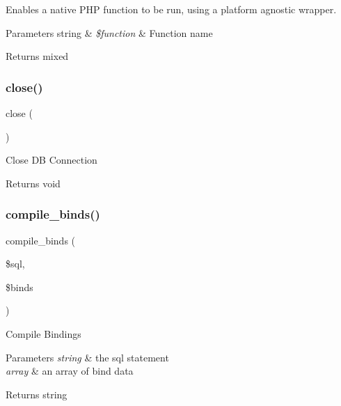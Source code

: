 Enables a native P\+HP function to be run, using a platform agnostic wrapper.


\begin{DoxyParams}[1]{Parameters}
string & {\em \$function} & Function name \\
\hline
\end{DoxyParams}
\begin{DoxyReturn}{Returns}
mixed 
\end{DoxyReturn}
\mbox{\label{class_c_i___d_b__driver_aa69c8bf1f1dcf4e72552efff1fe3e87e}} 
\subsubsection{\texorpdfstring{close()}{close()}}
{\footnotesize\ttfamily close (\begin{DoxyParamCaption}{ }\end{DoxyParamCaption})}

Close DB Connection

\begin{DoxyReturn}{Returns}
void 
\end{DoxyReturn}
\mbox{\label{class_c_i___d_b__driver_a0ba381d2e9078472bd0167e75cc8033c}} 
\subsubsection{\texorpdfstring{compile\+\_\+binds()}{compile\_binds()}}
{\footnotesize\ttfamily compile\+\_\+binds (\begin{DoxyParamCaption}\item[{}]{\$sql,  }\item[{}]{\$binds }\end{DoxyParamCaption})}

Compile Bindings


\begin{DoxyParams}{Parameters}
{\em string} & the sql statement \\
\hline
{\em array} & an array of bind data \\
\hline
\end{DoxyParams}
\begin{DoxyReturn}{Returns}
string 
\end{DoxyReturn}
\mbox{\label{class_c_i___d_b__driver_a7f59c2dc2e3226fe49f35f8c49e8fc94}} 
